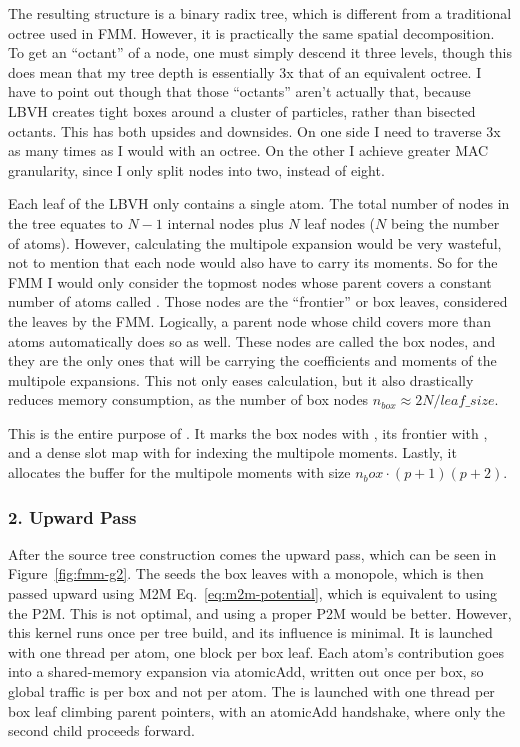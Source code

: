 The resulting structure is a binary radix tree, which is different from a traditional octree used in FMM.
However, it is practically the same spatial decomposition.
To get an ``octant'' of a node, one must simply descend it three levels, though this does mean that my tree depth is essentially 3x that of an equivalent octree.
I have to point out though that those ``octants'' aren't actually that, because LBVH creates tight boxes around a cluster of particles, rather than bisected octants.
This has both upsides and downsides.
On one side I need to traverse 3x as many times as I would with an octree.
On the other I achieve greater MAC granularity, since I only split nodes into two, instead of eight.

Each leaf of the LBVH only contains a single atom.
The total number of nodes in the tree equates to $N-1$ internal nodes plus $N$ leaf nodes ($N$ being the number of atoms).
However, calculating the multipole expansion would be very wasteful, not to mention that each node would also have to carry its moments.
So for the FMM I would only consider the topmost nodes whose parent covers a constant number of atoms called .
Those nodes are the ``frontier'' or box leaves, considered the leaves by the FMM.
Logically, a parent node whose child covers more than  atoms automatically does so as well.
These nodes are called the box nodes, and they are the only ones that will be carrying the coefficients and moments of the multipole expansions.
This not only eases calculation, but it also drastically reduces memory consumption, as the number of box nodes $n_{box} \approx 2N / leaf\_size$.

This is the entire purpose of .
It marks the box nodes with , its frontier with , and a dense slot map with  for indexing the multipole moments.
Lastly, it allocates the buffer for the multipole moments with size $n_box \cdot (p+1)(p+2)$.



\subsubsection{2. Upward Pass}

After the source tree construction comes the upward pass, which can be seen in Figure~\ref{fig:fmm-g2}.
The  seeds the box leaves with a monopole, which is then passed upward using M2M Eq.~\eqref{eq:m2m-potential}, which is equivalent to using the P2M.
This is not optimal, and using a proper P2M would be better. However, this kernel runs once per tree build, and its influence is minimal.
It is launched with one thread per atom, one block per box leaf.
Each atom's contribution goes into a shared-memory expansion via atomicAdd, written out once per box, so global traffic is per box and not per atom.
The  is launched with one thread per box leaf climbing parent pointers, with an atomicAdd handshake, where only the second child proceeds forward.


